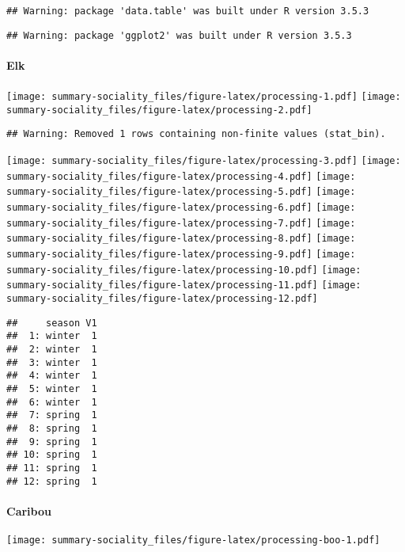 \documentclass[]{article}
\title{}
\author{}
\date{}
\let\oldparagraph\paragraph
\renewcommand{\paragraph}[1]{\oldparagraph{#1}\mbox{}}
\begin{document}
\begin{verbatim}
## Warning: package 'data.table' was built under R version 3.5.3
\end{verbatim}

\begin{verbatim}
## Warning: package 'ggplot2' was built under R version 3.5.3
\end{verbatim}

\paragraph{Elk}\label{elk}

\texttt{[image: summary-sociality\_files/figure-latex/processing-1.pdf]}
\texttt{[image: summary-sociality\_files/figure-latex/processing-2.pdf]}

\begin{verbatim}
## Warning: Removed 1 rows containing non-finite values (stat_bin).
\end{verbatim}

\texttt{[image: summary-sociality\_files/figure-latex/processing-3.pdf]}
\texttt{[image: summary-sociality\_files/figure-latex/processing-4.pdf]}
\texttt{[image: summary-sociality\_files/figure-latex/processing-5.pdf]}
\texttt{[image: summary-sociality\_files/figure-latex/processing-6.pdf]}
\texttt{[image: summary-sociality\_files/figure-latex/processing-7.pdf]}
\texttt{[image: summary-sociality\_files/figure-latex/processing-8.pdf]}
\texttt{[image: summary-sociality\_files/figure-latex/processing-9.pdf]}
\texttt{[image: summary-sociality\_files/figure-latex/processing-10.pdf]}
\texttt{[image: summary-sociality\_files/figure-latex/processing-11.pdf]}
\texttt{[image: summary-sociality\_files/figure-latex/processing-12.pdf]}

\begin{verbatim}
##     season V1
##  1: winter  1
##  2: winter  1
##  3: winter  1
##  4: winter  1
##  5: winter  1
##  6: winter  1
##  7: spring  1
##  8: spring  1
##  9: spring  1
## 10: spring  1
## 11: spring  1
## 12: spring  1
\end{verbatim}

\newpage 

\paragraph{Caribou}\label{caribou}

\texttt{[image: summary-sociality\_files/figure-latex/processing-boo-1.pdf]}
\end{document}
